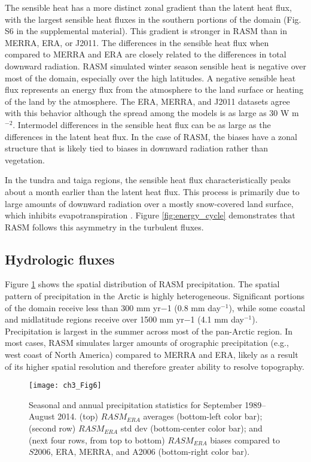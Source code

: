The sensible heat has a more distinct zonal gradient than the latent heat flux, with the largest sensible heat fluxes in the southern portions of the domain (Fig. S6 in the supplemental material).
This gradient is stronger in RASM than in MERRA, ERA, or J2011.
The differences in the sensible heat flux when compared to MERRA and ERA are closely related to the differences in total downward radiation.
RASM simulated winter season sensible heat is negative over most of the domain, especially over the high latitudes.
A negative sensible heat flux represents an energy flux from the atmosphere to the land surface or heating of the land by the atmosphere.
The ERA, MERRA, and J2011 datasets agree with this behavior although the spread among the models is as large as 30 W m$^{−2}$.
Intermodel differences in the sensible heat flux can be as large as the differences in the latent heat flux.
In the case of RASM, the biases have a zonal structure that is likely tied to biases in downward radiation rather than vegetation.

In the tundra and taiga regions, the sensible heat flux characteristically peaks about a month earlier than the latent heat flux.
This process is primarily due to large amounts of downward radiation over a mostly snow-covered land surface, which inhibits evapotranspiration \citep{Betts_2001}.
Figure \ref{fig:energy_cycle} demonstrates that RASM follows this asymmetry in the turbulent fluxes.

\subsection{Hydrologic fluxes}

Figure \ref{fig:prec_maps} shows the spatial distribution of RASM precipitation.
The spatial pattern of precipitation in the Arctic is highly heterogeneous.
Significant portions of the domain receive less than 300 mm yr−1 (0.8 mm day$^{−1}$), while some coastal and midlatitude regions receive over 1500 mm yr−1 (4.1 mm day$^{−1}$).
Precipitation is largest in the summer across most of the pan-Arctic region.
In most cases, RASM simulates larger amounts of orographic precipitation (e.g., west coast of North America) compared to MERRA and ERA, likely as a result of its higher spatial resolution and therefore greater ability to resolve topography.


\begin{figure}
  \centering
  \texttt{[image: ch3\_Fig6]}
  \caption{Seasonal and annual precipitation statistics for September 1989–August 2014.
  (top) $RASM_{ERA}$ averages (bottom-left color bar); (second row) $RASM_{ERA}$ std dev (bottom-center color bar); and (next four rows, from top to bottom) $RASM_{ERA}$ biases compared to $S2006$, ERA, MERRA, and A2006 (bottom-right color bar).}
  \label{fig:prec_maps}
\end{figure}

